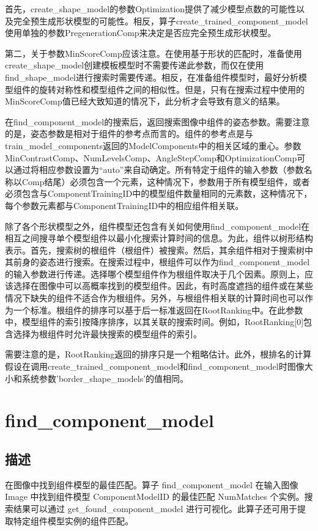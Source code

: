 \documentclass{article}
\begin{document}
首先，create\_shape\_model的参数Optimization提供了减少模型点数的可能性以及完全预生成形状模型的可能性。相反，算子create\_trained\_component\_model使用单独的参数PregenerationComp来决定是否应完全预生成形状模型。

第二，关于参数MinScoreComp应该注意。在使用基于形状的匹配时，准备使用create\_shape\_model创建模板模型时不需要传递此参数，而仅在使用find\_shape\_model进行搜索时需要传递。相反，在准备组件模型时，最好分析模型组件的旋转对称性和模型组件之间的相似性。但是，只有在搜索过程中使用的MinScoreComp值已经大致知道的情况下，此分析才会导致有意义的结果。

在find\_component\_model的搜索后，返回搜索图像中组件的姿态参数。需要注意的是，姿态参数是相对于组件的参考点而言的。组件的参考点是与train\_model\_components返回的ModelComponents中的相关区域的重心。参数MinContrastComp、NumLevelsComp、AngleStepComp和OptimizationComp可以通过将相应参数设置为“auto”来自动确定。所有特定于组件的输入参数（参数名称以Comp结尾）必须包含一个元素，这种情况下，参数用于所有模型组件，或者必须包含与ComponentTrainingID中的模型组件数量相同的元素数，这种情况下，每个参数元素都与ComponentTrainingID中的相应组件相关联。

除了各个形状模型之外，组件模型还包含有关如何使用find\_component\_model在相互之间搜寻单个模型组件以最小化搜索计算时间的信息。为此，组件以树形结构表示。首先，搜索树的根组件（根组件）被搜索。然后，其余组件相对于搜索树中其前身的姿态进行搜索。在搜索过程中，根组件可以作为find\_component\_model的输入参数进行传递。选择哪个模型组件作为根组件取决于几个因素。原则上，应该选择在图像中可以高概率找到的模型组件。因此，有时高度遮挡的组件或在某些情况下缺失的组件不适合作为根组件。另外，与根组件相关联的计算时间也可以作为一个标准。根组件的排序可以基于后一标准返回在RootRanking中。在此参数中，模型组件的索引按降序排序，以其关联的搜索时间。例如，RootRanking[0]包含选择为根组件时允许最快搜索的模型组件的索引。

需要注意的是，RootRanking返回的排序只是一个粗略估计。此外，根排名的计算假设在调用create\_trained\_component\_model和find\_component\_model时图像大小和系统参数'border\_shape\_models'的值相同。

\section{find\_component\_model}
\subsection{描述}
在图像中找到组件模型的最佳匹配。算子 find\_component\_model 在输入图像 Image 中找到组件模型 ComponentModelID 的最佳匹配 NumMatches 个实例。搜索结果可以通过 get\_found\_component\_model 进行可视化。此算子还可用于提取特定组件模型实例的组件匹配。
\end{document}
